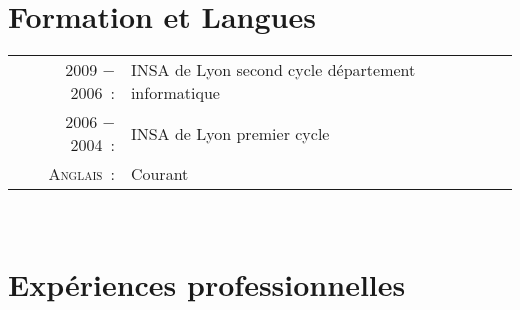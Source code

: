 \documentclass[a4paper,10pt]{article}
\begin{document}
  \section{Formation et Langues}
  \begin{tabular}{rl}
    2009 − 2006 :       & INSA de Lyon second cycle département informatique \\
    2006 − 2004 :       & INSA de Lyon premier cycle \\
    \textsc{Anglais :}  & Courant \\
  \end{tabular} \\

  \section{Expériences professionnelles}
\end{document}
